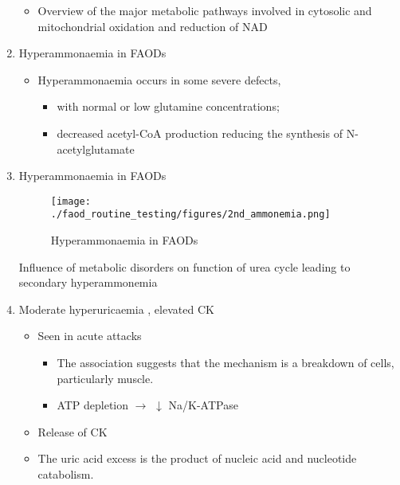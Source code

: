 \documentclass{scrartcl}
\begin{document}
\begin{enumerate}
\begin{itemize}
\item Overview of the major metabolic pathways involved in cytosolic and
mitochondrial oxidation and reduction of NAD
\end{itemize}

\item Hyperammonaemia in FAODs
\label{sec:org42b3821}
\begin{itemize}
\item Hyperammonaemia occurs in some severe defects,
\begin{itemize}
\item with normal or low glutamine concentrations;
\item decreased acetyl-CoA production reducing the synthesis of N-acetylglutamate
\end{itemize}
\end{itemize}

\item Hyperammonaemia in FAODs
\label{sec:org7f72c0b}
\begin{figure}[htbp]
\centering
\texttt{[image: ./faod\_routine\_testing/figures/2nd\_ammonemia.png]}
\caption{\label{fig:orge5cf867}
Hyperammonaemia in FAODs}
\end{figure}

Influence of metabolic disorders on function of urea cycle leading to secondary hyperammonemia

\item Moderate hyperuricaemia , elevated CK
\label{sec:orgcfac75c}
\begin{itemize}
\item Seen in acute attacks 
\begin{itemize}
\item The association suggests that the mechanism is a breakdown of
cells, particularly muscle.
\item ATP depletion \(\to\) \(\downarrow\) Na/K-ATPase
\end{itemize}
\item Release of CK
\item The uric acid excess is the product of nucleic acid and nucleotide catabolism.
\end{itemize}


\end{enumerate}
\end{document}
